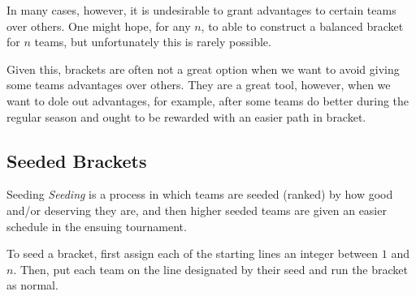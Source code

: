 \documentclass[../main.tex]{subfiles}
\begin{document}
In many cases, however, it is undesirable to grant advantages to certain teams over others. One might hope, for any $n$, to able to construct a balanced bracket for $n$ teams, but unfortunately this is rarely possible.

    

Given this, brackets are often not a great option when we want to avoid giving some teams advantages over others. They are a great tool, however, when we want to dole out advantages, for example, after some teams do better during the regular season and ought to be rewarded with an easier path in bracket.

\subsection{Seeded Brackets}
\begin{definition}{Seeding}{}
    \textit{Seeding} is a process in which teams are seeded (ranked) by how good and/or deserving they are, and then higher seeded teams are given an easier schedule in the ensuing tournament.
\end{definition}
To seed a bracket, first assign each of the starting lines an integer between $1$ and $n$. Then, put each team on the line designated by their seed and run the bracket as normal.
\end{document}
